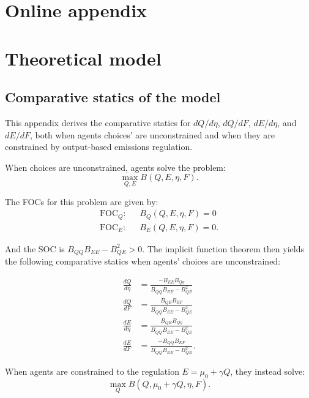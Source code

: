 \documentclass[12pt]{article}
\begin{document}
\singlespace
\newpage


\appendix
\setcounter{page}{1}
\renewcommand{\thepage}{A-\arabic{page}}

\section*{Online appendix}

\section{Theoretical model}


\subsection{Comparative statics of the model} \label{appx:cs}

This appendix derives the comparative statics for $dQ/d\eta$, $dQ/dF$, $dE/d\eta$, and $dE/dF$, both when agents choices' are unconstrained and when they are constrained by output-based emissions regulation.

When choices are unconstrained, agents solve the problem:
\begin{equation}
\max_{Q,E} B(Q,E,\eta,F).
\end{equation}

The FOCs for this problem are given by:
\begin{align}
\text{FOC}_Q:& \text{ } B_Q(Q,E,\eta,F)=0  \\
\text{FOC}_E:& \text{ } B_E(Q,E,\eta,F)=0.
\end{align}

And the SOC is $B_{QQ}B_{EE}-B_{QE}^2>0$. The implicit function theorem then yields the following comparative statics when agents' choices are unconstrained:

\begin{align}
\frac{dQ}{d\eta}&=\frac{-B_{EE}B_{Q\eta}}{B_{QQ}B_{EE}-B_{QE}^2} \label{eq:A1_dQdeta_u} \\
\frac{dQ}{dF}&=\frac{B_{QE}B_{EF}}{B_{QQ}B_{EE}-B_{QE}^2} \label{en:A1_dQdF_u} \\
\frac{dE}{d\eta}&=\frac{B_{QE}B_{Q\eta}}{B_{QQ}B_{EE}-B_{QE}^2} \label{eq:A1_dEdeta_u} \\
\frac{dE}{dF}&=\frac{-B_{QQ}B_{EF}}{B_{QQ}B_{EE}-B_{QE}^2}. \label{eq:A1_dEdF_u} 
\end{align}

When agents are constrained to the regulation $E=\mu_0+\gamma Q$, they instead solve:
\begin{equation}
\max_{Q} B(Q,\mu_0+\gamma Q,\eta,F).
\end{equation}
\end{document}
